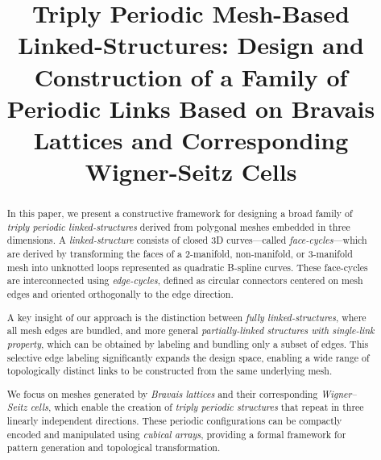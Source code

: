 \documentclass[times,twocolumn,final]{elsarticle}
\newcommand{\ergun}[1]{{\color{red} #1}}
\begin{document}

\begin{frontmatter}

\title{Triply Periodic Mesh-Based Linked-Structures: Design and Construction of a Family of Periodic Links Based on Bravais Lattices and Corresponding Wigner-Seitz Cells}





\received{\today}

\begin{abstract}
In this paper, we present a constructive framework for designing a broad family of \textit{triply periodic linked-structures} derived from polygonal meshes embedded in three dimensions. A \textit{linked-structure} consists of closed 3D curves—called \textit{face-cycles}—which are derived by transforming the faces of a 2-manifold, non-manifold, or 3-manifold mesh into unknotted loops represented as quadratic B-spline curves. These face-cycles are interconnected using \textit{edge-cycles}, defined as circular connectors centered on mesh edges and oriented orthogonally to the edge direction.


A key insight of our approach is the distinction between \textit{fully linked-structures}, where all mesh edges are bundled, and more general \textit{\ergun{partially-linked structures with single-link property}}, which can be obtained by labeling and bundling only a subset of edges. This selective edge labeling significantly expands the design space, enabling a wide range of topologically distinct links to be constructed from the same underlying mesh. 

We focus on meshes generated by \textit{Bravais lattices} and their corresponding \textit{Wigner--Seitz cells}, which enable the creation of \textit{triply periodic structures} that repeat in three linearly independent directions. These periodic configurations can be compactly encoded and manipulated using \textit{cubical arrays}, providing a formal framework for pattern generation and topological transformation.


\end{abstract}
\end{frontmatter}
\end{document}
